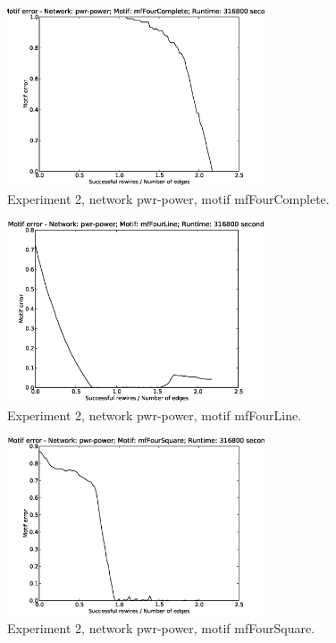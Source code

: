 \begin{figure}[p]
\centering
\includegraphics[width=3in]{Figures/motif_error-pwr-power-mfFourComplete.eps}
\caption{Experiment 2, network pwr-power, motif mfFourComplete.}
\label{fig:exp2-pwr-power-mfFourComplete}
\end{figure}

\begin{figure}[p]
\centering
\includegraphics[width=3in]{Figures/motif_error-pwr-power-mfFourLine.eps}
\caption{Experiment 2, network pwr-power, motif mfFourLine.}
\label{fig:exp2-pwr-power-mfFourLine}
\end{figure}

\begin{figure}[p]
\centering
\includegraphics[width=3in]{Figures/motif_error-pwr-power-mfFourSquare.eps}
\caption{Experiment 2, network pwr-power, motif mfFourSquare.}
\label{fig:exp2-pwr-power-mfFourSquare}
\end{figure}

